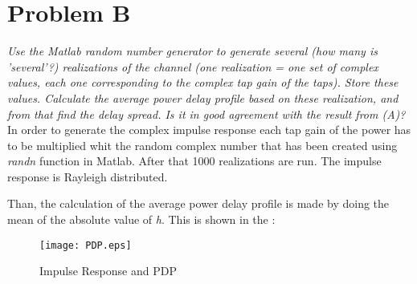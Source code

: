 \section{Problem B}
\textit{Use the Matlab random number generator to generate several (how many is 'several'?) realizations of the channel (one realization = one set of complex values, each one corresponding to the complex tap gain of the taps). Store these values. Calculate the average power delay profile based on these realization, and from that find the delay spread. Is it in good agreement with the result from (A)?}\\
 
In order to generate the complex impulse response each tap gain of the power has to be multiplied whit the random complex number that has been created using \textit{randn} function in Matlab. After that 1000 realizations are run. The impulse response is Rayleigh distributed.


Than, the calculation of the average power delay profile is made by doing the mean of the absolute value of \textit{h}. This is shown in the  :

\begin{figure}
\centering
\texttt{[image: PDP.eps]}
\caption{Impulse Response and PDP}\label{fig:Impulse_Response}
\end{figure}